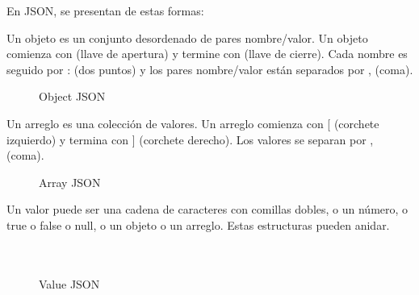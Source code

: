 En JSON, se presentan de estas formas:


Un objeto es un conjunto desordenado de pares nombre/valor. Un objeto comienza con { (llave de apertura) y termine con } (llave de cierre). Cada nombre es seguido por : (dos puntos) y los pares nombre/valor están separados por , (coma).
\begin{figure}[htbp]
\centering
{}
\caption{Object JSON} \label{fig:objectJSON}
\end{figure}

Un arreglo es una colecci\'on de valores. Un arreglo comienza con [ (corchete izquierdo) y termina con ] (corchete derecho). Los valores se separan por , (coma).

\begin{figure}[htbp]
\centering
{}
\caption{Array JSON} \label{fig:arrayJSON}
\end{figure}

Un valor puede ser una cadena de caracteres con comillas dobles, o un n\'umero, o true o false o null, o un objeto o un arreglo. Estas estructuras pueden anidar.\\\\\\

\begin{figure}[htbp]
\centering
{}
\caption{Value JSON} \label{fig:valueJSON}
\end{figure}

